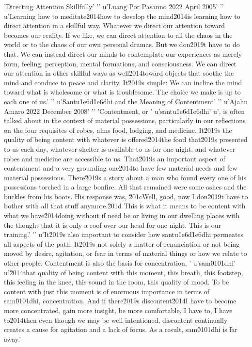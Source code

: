 'Directing Attention Skillfully'
'\n'
u'Luang Por Pasanno \u2022 April 2005'
'\n'
u'Learning how to meditate\u2014how to develop the mind\u2014is learning how to direct attention in a skillful way. Whatever we direct our attention toward becomes our reality. If we like, we can direct attention to all the chaos in the world or to the chaos of our own personal dramas. But we don\u2019t have to do that. We can instead direct our minds to contemplate our experiences as merely form, feeling, perception, mental formations, and consciousness. We can direct our attention in other skillful ways as well\u2014toward objects that soothe the mind and conduce to peace and clarity. It\u2019s simple: We can incline the mind toward what is wholesome or what is troublesome. The choice we make is up to each one of us.'
'\n'
u'Santu\u1e6d\u1e6dhi and the Meaning of Contentment'
'\n'
u'Ajahn Amaro \u2022 December 2008'
'\n'
'Contentment, or '
u'santu\u1e6d\u1e6dhi'
u', is often talked about in the context of material possessions, particularly in our reflections on the four requisites of robes, alms food, lodging, and medicine. It\u2019s the quality of being content with whatever is offered\u2014the food that\u2019s presented to us each day, whatever shelter is available to us for one night, and whatever robes and medicine are accessible to us. That\u2019s an important aspect of contentment and a very grounding one\u2014to have few material needs and few material possessions. There\u2019s a story about a man who found every one of his possessions torched in a large bonfire. All that remained were some ashes and the buckles from his boots. His response was, \u201cWell, good, now I don\u2019t have to bother with all that stuff anymore.\u201d This is what it means to be content with what we have\u2014doing without if need be or living in our dwelling places with the thought that it is only a roof over our head for one night. This is our training.'
'\n'
u'It\u2019s also important to consider how santu\u1e6d\u1e6dhi permeates all aspects of the path. It\u2019s not solely a matter of renunciation or not being moved by desire, agitation, or fear in terms of material things or how we relate to other people. Contentment is also the basis for concentration, '
u'sam\u0101dhi'
u'\u2014that quality of being content with this moment, this breath, this footstep, this feeling in the knee, this sound in the room, this quality of mood. To be content with just this moment is of enormous importance in terms of sam\u0101dhi, concentration. And if there\u2019s discontent\u2014I have to become more concentrated, gain more insight, be more comfortable, I have to, I have to\u2014then even though we may be well intentioned, discontent continually creates a cause for agitation and a lack of focus. As a result, sam\u0101dhi is far away.'
